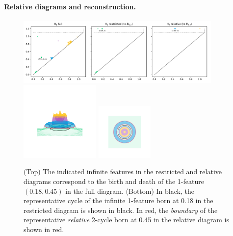 \paragraph*{Relative diagrams and reconstruction.}

\begin{figure}[htbp]
  \centering
  \includegraphics[width=0.9\textwidth]{figures/relative/dgm-0_0.pdf}
  \includegraphics[trim=500 800 500 800, clip, width=0.35\textwidth]{figures/relative/surf_side-0_0.png}
  \includegraphics[trim=500 500 500 500, clip, width=0.25\textwidth]{figures/relative/surf_top-0_0.png}
  \caption{(Top) The indicated infinite features in the restricted and relative diagrams correspond to the birth and death of the 1-feature $(0.18, 0.45)$ in the full diagram.
  (Bottom) In black, the representative cycle of the infinite 1-feature born at 0.18 in the restricted diagram is shown in black.
  In red, the \emph{boundary} of the representative \emph{relative} 2-cycle born at 0.45 in the relative diagram is shown in red.}\label{fig:relative1}
\end{figure}

